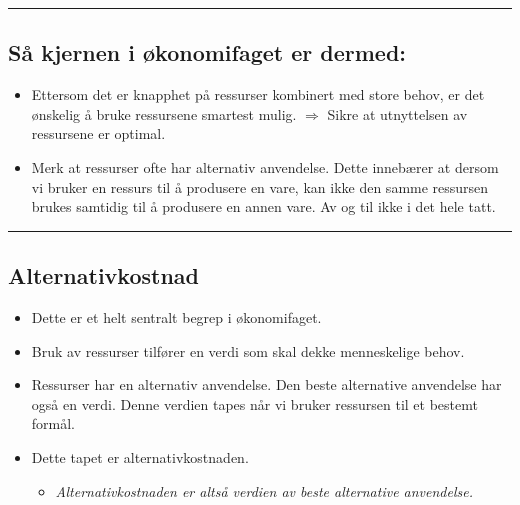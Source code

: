 \documentclass[
  letterpaper,
  DIV=11,
  numbers=noendperiod]{scrartcl}
\providecommand{\tightlist}{%
  \setlength{\itemsep}{0pt}\setlength{\parskip}{0pt}}\usepackage{longtable,booktabs,array}
\begin{document}
\begin{center}\rule{0.5\linewidth}{0.5pt}\end{center}

\subsection{Så kjernen i økonomifaget er
dermed:}\label{suxe5-kjernen-i-uxf8konomifaget-er-dermed}

\begin{itemize}
\tightlist
\item
  Ettersom det er knapphet på ressurser kombinert med store behov, er
  det ønskelig å bruke ressursene smartest mulig. \(\Rightarrow\) Sikre
  at utnyttelsen av ressursene er optimal.
\item
  Merk at ressurser ofte har alternativ anvendelse. Dette innebærer at
  dersom vi bruker en ressurs til å produsere en vare, kan ikke den
  samme ressursen brukes samtidig til å produsere en annen vare. Av og
  til ikke i det hele tatt.
\end{itemize}

\begin{center}\rule{0.5\linewidth}{0.5pt}\end{center}

\subsection{Alternativkostnad}\label{alternativkostnad}

\begin{itemize}
\tightlist
\item
  Dette er et helt sentralt begrep i økonomifaget.
\item
  Bruk av ressurser tilfører en verdi som skal dekke menneskelige behov.
\item
  Ressurser har en alternativ anvendelse. Den beste alternative
  anvendelse har også en verdi. Denne verdien tapes når vi bruker
  ressursen til et bestemt formål.
\item
  Dette tapet er alternativkostnaden.

  \begin{itemize}
  \tightlist
  \item
    \emph{Alternativkostnaden er altså verdien av beste alternative
    anvendelse.}
  \end{itemize}
\end{itemize}
\end{document}
